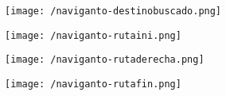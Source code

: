 \begin{figure}[h]
  \begin{minipage}[b]{0.5\linewidth}
    \begin{center}
      \texttt{[image: /naviganto-destinobuscado.png]}
    \end{center}
  \end{minipage}
  \begin{minipage}[b]{0.5\linewidth}
    \begin{center}
      \texttt{[image: /naviganto-rutaini.png]}
    \end{center}
  \end{minipage}
\end{figure}

\begin{figure}[h]
  \begin{minipage}[b]{0.5\linewidth}
    \begin{center}
      \texttt{[image: /naviganto-rutaderecha.png]}
    \end{center}
  \end{minipage}
  \begin{minipage}[b]{0.5\linewidth}
    \begin{center}
      \texttt{[image: /naviganto-rutafin.png]}
    \end{center}
  \end{minipage}
\end{figure}


